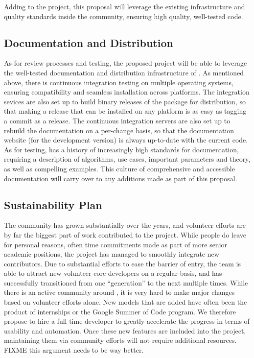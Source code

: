Adding to the \sklearn{} project, this proposal will leverage the existing infrastructure
and quality standards inside the \sklearn{} community, ensuring high quality, well-tested code.

\subsection{Documentation and Distribution}
As for review processes and testing, the proposed project will be able to leverage the
well-tested documentation and distribution infrastructure of \sklearn{}.
As mentioned above, there is continuous integration testing on multiple operating systems,
ensuring compatibility and seamless installation across platforms.
The integration sevices are also set up to build binary releases of the \sklearn{} package
for distribution, so that making a release that can be installed on any platform is as
easy as tagging a commit as a release.
The continuous integration servers are also set up to rebuild the documentation on a per-change
basis, so that the documentation website (for the development version) is always up-to-date
with the current code.
As for testing, \sklearn{} has a history of increasingly high standards for documentation,
requiring a description of algorithms, use cases, important parameters and theory,
as well as compelling examples. This culture of comprehensive and accessible documentation
will carry over to any additions made as part of this proposal.

\subsection{Sustainability Plan}
The \sklearn{} community has grown substantially over the years, and volunteer efforts
are by far the biggest part of work contributed to the project.
While people do leave for personal reasons, often time commitments made as part
of more senior academic positions, the project has managed to smoothly integrate new
contributors. Due to substantial efforts to ease the barrier of entry, the \sklearn{}
team is able to attract new volunteer core developers on a regular basis, and has
successfully transitioned from one ``generation'' to the next multiple times.
While there is an active community around \sklearn{}, it is very hard to make
major changes based on volunteer efforts alone. New models that are added have often
been the product of internships or the Google Summer of Code program.
We therefore propose to hire a full time developer to greatly accelerate the progress
in terms of usability and automation.
Once these new features are included into the project, maintaining them via community
efforts will not require additional resources. FIXME this argument needs to be way better.

